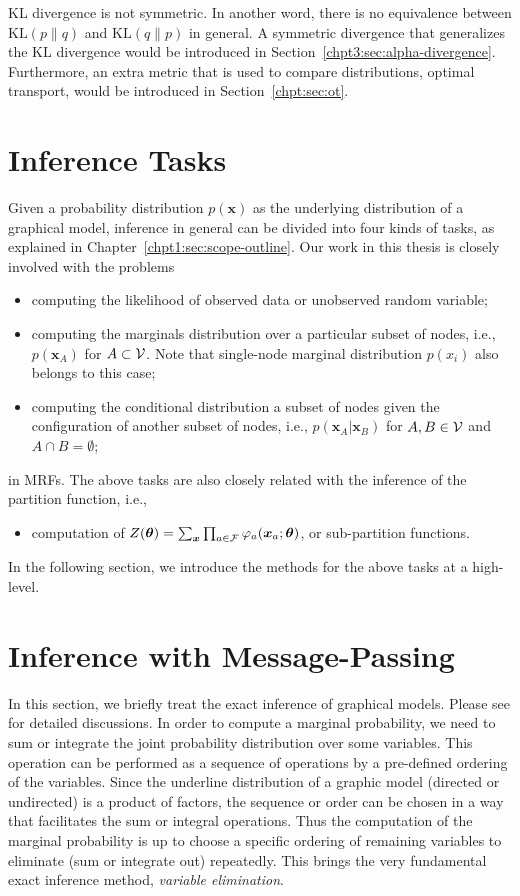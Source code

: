 KL divergence is not symmetric. In another word, there is no equivalence between $\mathrm{KL}(p\|q)$ and $\mathrm{KL}(q\|p)$ in general. A symmetric divergence that generalizes the KL divergence would be introduced in Section~\ref{chpt3:sec:alpha-divergence}. Furthermore, an extra metric that is used to compare distributions, optimal transport, would be introduced in Section~\ref{chpt:sec:ot}.



\section{Inference Tasks}


Given a probability distribution $p(\bm{x})$ as the underlying distribution of a graphical model, inference in general can be divided into four kinds of tasks, as explained in Chapter~\ref{chpt1:sec:scope-outline}. Our work in this thesis is closely involved with the problems
\begin{itemize}
\item computing the likelihood of observed data or unobserved random variable;
\item computing the marginals distribution over a particular subset of nodes, i.e., $p(\bm{x}_A)$ for $A \subset \mathcal{V}$. Note that single-node marginal distribution $p(x_i)$ also belongs to this case;
\item computing the conditional distribution a subset of nodes given the configuration of another subset of nodes, i.e., $p(\bm{x}_A| \bm{x}_B)$ for $A, B \in \mathcal{V}$ and $A \cap B = \emptyset$;
\end{itemize}
in MRFs. The above tasks are also closely related with the inference of the partition function, i.e.,
\begin{itemize}
\item computation of $Z(\bm{\theta}) = \sum_{\bm{x}} \prod_{a \in \mathcal{F}} \varphi_{a}(\bm{x}_{a};\bm{\theta})$, or sub-partition functions.
\end{itemize}

In the following section, we introduce the methods for the above tasks at a high-level.

\section{Inference with Message-Passing}
\label{chpt2:sec:inference-mp}
In this section, we briefly treat the exact inference of graphical models. Please see \cite{Bishop:2006:PRM:1162264, koller2009pgm, yedida2005constucting, yedidia2003understanding} for detailed discussions. In order to compute a marginal probability, we need to sum or integrate the joint probability distribution over some variables. This operation can be performed as a sequence of operations by a pre-defined ordering of the variables. Since the underline distribution of a graphic model (directed or undirected) is a product of factors, the sequence or order can be chosen in a way that facilitates the sum or integral operations. Thus the computation of the marginal probability is up to choose a specific ordering of remaining variables to eliminate (sum or integrate out) repeatedly. This brings the very fundamental exact inference method, \textit{variable elimination}.


